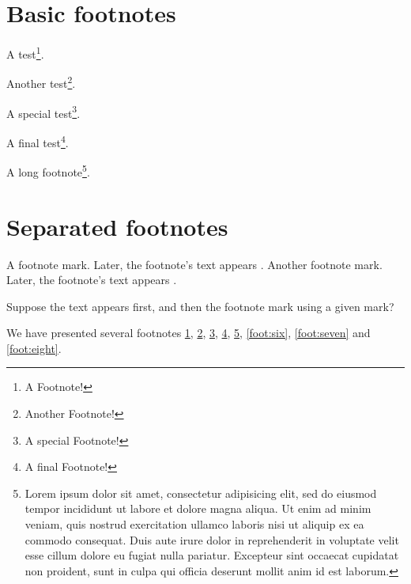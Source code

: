 \documentclass{article}
\begin{document}
\section{Basic footnotes}
A test\footnote{A Footnote!\label{foot:one}}.

Another test\footnote{Another Footnote!\label{foot:two}}.

A special test\footnote[77]{A special Footnote!\label{foot:three}}.

A final test\footnote{A final Footnote!\label{foot:four}}.

A long footnote\footnote{Lorem ipsum dolor sit amet, consectetur adipisicing elit, sed do eiusmod tempor incididunt ut labore et dolore magna aliqua. Ut enim ad minim veniam, quis nostrud exercitation ullamco laboris nisi ut aliquip ex ea commodo consequat. Duis aute irure dolor in reprehenderit in voluptate velit esse cillum dolore eu fugiat nulla pariatur. Excepteur sint occaecat cupidatat non proident, sunt in culpa qui officia deserunt mollit anim id est laborum.\label{foot:five}}.

\section{Separated footnotes}
A footnote mark\footnotemark.
Later, the footnote's text appears
.
Another footnote mark\footnotemark.
Later, the footnote's text appears
.

Suppose the text appears first,
and then the footnote mark using a given mark\footnotemark[999]?

We have presented several footnotes \ref{foot:one}, \ref{foot:two}, \ref{foot:three},
 \ref{foot:four}, \ref{foot:five}, \ref{foot:six}, \ref{foot:seven} and \ref{foot:eight}.
\end{document}
